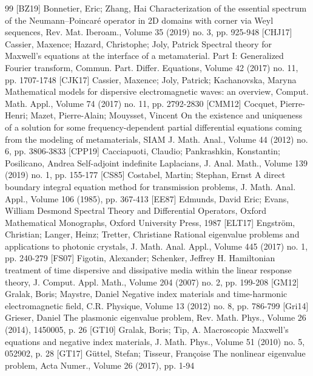 \documentclass[10pt]{amsart}
\theoremstyle{definition}
\begin{document}
\begin{thebibliography}{99}
 [BZ19] Bonnetier, Eric; Zhang, Hai Characterization of the essential spectrum of the Neumann–Poincaré operator in 2D domains with corner via Weyl sequences, Rev. Mat. Iberoam., Volume 35 (2019) no. 3, pp. 925-948
 [CHJ17] Cassier, Maxence; Hazard, Christophe; Joly, Patrick Spectral theory for Maxwell’s equations at the interface of a metamaterial. Part I: Generalized Fourier transform, Commun. Part. Differ. Equations, Volume 42 (2017) no. 11, pp. 1707-1748
 [CJK17] Cassier, Maxence; Joly, Patrick; Kachanovska, Maryna Mathematical models for dispersive electromagnetic waves: an overview, Comput. Math. Appl., Volume 74 (2017) no. 11, pp. 2792-2830
 [CMM12] Cocquet, Pierre-Henri; Mazet, Pierre-Alain; Mouysset, Vincent On the existence and uniqueness of a solution for some frequency-dependent partial differential equations coming from the modeling of metamaterials, SIAM J. Math. Anal., Volume 44 (2012) no. 6, pp. 3806-3833
 [CPP19] Cacciapuoti, Claudio; Pankrashkin, Konstantin; Posilicano, Andrea Self-adjoint indefinite Laplacians, J. Anal. Math., Volume 139 (2019) no. 1, pp. 155-177
 [CS85] Costabel, Martin; Stephan, Ernst A direct boundary integral equation method for transmission problems, J. Math. Anal. Appl., Volume 106 (1985), pp. 367-413
 [EE87] Edmunds, David Eric; Evans, William Desmond Spectral Theory and Differential Operators, Oxford Mathematical Monographs, Oxford University Press, 1987
 [ELT17] Engström, Christian; Langer, Heinz; Tretter, Christiane Rational eigenvalue problems and applications to photonic crystals, J. Math. Anal. Appl., Volume 445 (2017) no. 1, pp. 240-279
 [FS07] Figotin, Alexander; Schenker, Jeffrey H. Hamiltonian treatment of time dispersive and dissipative media within the linear response theory, J. Comput. Appl. Math., Volume 204 (2007) no. 2, pp. 199-208
 [GM12] Gralak, Boris; Maystre, Daniel Negative index materials and time-harmonic electromagnetic field, C.R. Physique, Volume 13 (2012) no. 8, pp. 786-799
 [Gri14] Grieser, Daniel The plasmonic eigenvalue problem, Rev. Math. Phys., Volume 26 (2014), 1450005, p. 26
 [GT10] Gralak, Boris; Tip, A. Macroscopic Maxwell’s equations and negative index materials, J. Math. Phys., Volume 51 (2010) no. 5, 052902, p. 28
 [GT17] Güttel, Stefan; Tisseur, Françoise The nonlinear eigenvalue problem, Acta Numer., Volume 26 (2017), pp. 1-94

\end{thebibliography}
\end{document}
